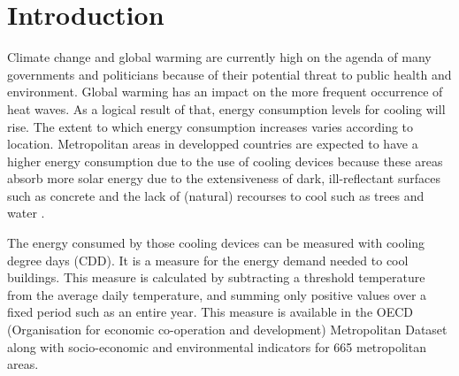\documentclass[fleqn,10pt]{SelfArx} %
\affiliation{\textsuperscript{1}\textit{Faculty of Science,  Master of Statistics and Data Science, KU Leuven, Leuven, Belgium}} %
\affiliation{*\textit{Team coordinator}} %
\begin{document}
\maketitle %


\thispagestyle{empty} %


\section*{Introduction} %


Climate change and global warming are currently high on the agenda of many governments and politicians because of their potential threat to public health and environment.  Global warming has an impact on the more frequent occurrence of heat waves\cite{BaldwinJaneWilson2019TCHW}.
As a logical result of that, energy consumption levels for cooling will rise.  The extent to which energy consumption increases varies according to location.  Metropolitan areas in developped countries are expected to have a higher energy consumption due to the use of cooling devices \cite{SivakMichael2009Pedf} because these areas absorb more solar energy due to the extensiveness of dark, ill-reflectant surfaces such as concrete and the lack of (natural) recourses to cool such as trees and water \cite{SmidM2019REcb,ROSSI2014621}.  

The energy consumed by those cooling devices can be measured with cooling degree days (CDD). It is a measure for the energy demand needed to cool buildings. This measure is calculated by subtracting a threshold temperature from the average daily temperature, and summing only positive values over a fixed period such as an entire year.  This measure is available in the OECD (Organisation for economic co-operation and development) Metropolitan Dataset along with socio-economic and environmental indicators for 665 metropolitan areas\cite{OECDmetro}.
\end{document}
